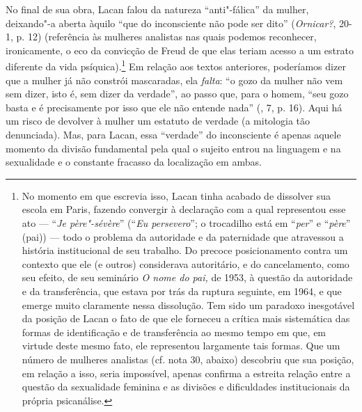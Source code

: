 No final de sua obra, Lacan falou da natureza ``anti"-fálica'' da mulher,
deixando"-a aberta àquilo ``que do inconsciente não pode ser dito''
(\emph{Ornicar?}, 20-1, p. 12) (referência às mulheres analistas nas
quais podemos reconhecer, ironicamente, o eco da convicção de Freud de
que elas teriam acesso a um estrato diferente da vida
psíquica).\footnote{No momento em que escrevia isso, Lacan tinha acabado
  de dissolver sua escola em Paris, fazendo convergir à declaração com a
  qual representou esse ato --- ``\emph{Je père"-sévère}'' (``\emph{Eu
  persevero}''; o trocadilho está em ``\emph{per}'' e ``\emph{père}''
  (pai)) --- todo o problema da autoridade e da paternidade que
  atravessou a história institucional de seu trabalho. Do precoce
  posicionamento contra um contexto que ele (e outros) considerava
  autoritário, e do cancelamento, como seu efeito, de seu seminário
  \emph{O nome do pai,} de 1953, à questão da autoridade e da
  transferência, que estava por trás da ruptura seguinte, em 1964, e que
  emerge muito claramente nessa dissolução. Tem sido um paradoxo
  inesgotável da posição de Lacan o fato de que ele forneceu a crítica
  mais sistemática das formas de identificação e de transferência ao
  mesmo tempo em que, em virtude deste mesmo fato, ele representou
  largamente tais formas. Que um número de mulheres analistas (cf. nota
  30, abaixo) descobriu que sua posição, em relação a isso, seria
  impossível, apenas confirma a estreita relação entre a questão da
  sexualidade feminina e as divisões e dificuldades institucionais da
  própria psicanálise.} Em relação aos textos anteriores, poderíamos
dizer que a mulher já não constrói mascaradas, ela \emph{falta}: ``o
gozo da mulher não vem sem dizer, isto é, sem dizer da verdade'', ao
passo que, para o homem, ``seu gozo basta e é precisamente por isso que
ele não entende nada'' (, 7, p. 16). Aqui há um risco de devolver à
mulher um estatuto de verdade (a mitologia tão denunciada). Mas, para
Lacan, essa ``verdade'' do inconsciente é apenas aquele momento da
divisão fundamental pela qual o sujeito entrou na linguagem e na
sexualidade e o constante fracasso da localização em ambas.

